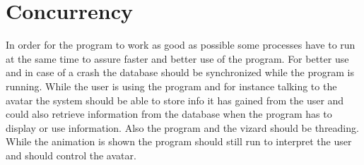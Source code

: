 \section{Concurrency}
\label{sec:concur}

In order for the program to work as good as possible some processes have to run at the same time to assure faster and better use of the program. 
For better use and in case of a crash the database should be synchronized while the program is running. While the user is using the program and for instance talking to the avatar the system should be able to store info it has gained from the user and could also retrieve information from the database when the program has to display or use information.
Also the program and the vizard should be threading. While the animation is shown the program should still run to interpret the user and should control the avatar. 
